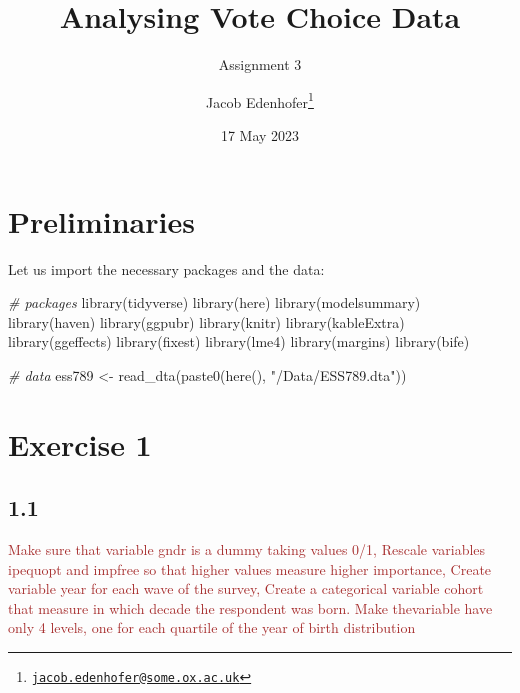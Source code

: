 \documentclass[
]{article}
\title{Analysing Vote Choice Data}
\subtitle{Assignment 3}
\author{Jacob Edenhofer\footnote{\href{mailto:jacob.edenhofer@some.ox.ac.uk}{\nolinkurl{jacob.edenhofer@some.ox.ac.uk}}}}
\date{17 May 2023}
\newenvironment{Shaded}{\begin{snugshade}}{\end{snugshade}}
\newcommand{\CommentTok}[1]{\textcolor[rgb]{0.56,0.35,0.01}{\textit{#1}}}
\newcommand{\FunctionTok}[1]{\textcolor[rgb]{0.00,0.00,0.00}{#1}}
\newcommand{\NormalTok}[1]{#1}
\newcommand{\OtherTok}[1]{\textcolor[rgb]{0.56,0.35,0.01}{#1}}
\newcommand{\StringTok}[1]{\textcolor[rgb]{0.31,0.60,0.02}{#1}}
\begin{document}
\maketitle

\hypertarget{preliminaries}{%
\section{Preliminaries}\label{preliminaries}}

Let us import the necessary packages and the data:

\begin{Shaded}
\begin{Highlighting}[]
\CommentTok{\# packages }
\FunctionTok{library}\NormalTok{(tidyverse)}
\FunctionTok{library}\NormalTok{(here)}
\FunctionTok{library}\NormalTok{(modelsummary)}
\FunctionTok{library}\NormalTok{(haven)}
\FunctionTok{library}\NormalTok{(ggpubr)}
\FunctionTok{library}\NormalTok{(knitr)}
\FunctionTok{library}\NormalTok{(kableExtra)}
\FunctionTok{library}\NormalTok{(ggeffects)}
\FunctionTok{library}\NormalTok{(fixest)}
\FunctionTok{library}\NormalTok{(lme4)}
\FunctionTok{library}\NormalTok{(margins)}
\FunctionTok{library}\NormalTok{(bife)}

\CommentTok{\# data}
\NormalTok{ess789 }\OtherTok{\textless{}{-}} \FunctionTok{read\_dta}\NormalTok{(}\FunctionTok{paste0}\NormalTok{(}\FunctionTok{here}\NormalTok{(), }\StringTok{"/Data/ESS789.dta"}\NormalTok{))}
\end{Highlighting}
\end{Shaded}

\hypertarget{exercise-1}{%
\section{Exercise 1}\label{exercise-1}}

\hypertarget{section}{%
\subsection{1.1}\label{section}}

\textcolor{brown}{Make sure that variable gndr is a dummy taking values 0/1, Rescale variables ipequopt and impfree so that higher values measure higher importance, Create variable year for each wave of the survey, Create a categorical variable cohort that measure in which decade the respondent was born. Make thevariable have only 4 levels, one for each quartile of the year of birth distribution}
\end{document}
